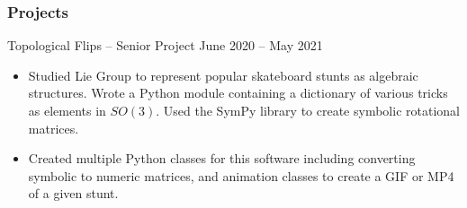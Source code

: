 \documentclass[letterpaper, 10 pt]{article}
\begin{document}
\subsubsection*{Projects}
\centerline{Topological Flips – Senior Project \hfill June 2020 – May 2021}
\begin{itemize}
\setlength\itemsep{0.10 em}
\item Studied Lie Group to represent popular skateboard stunts as algebraic structures. Wrote a Python module containing a dictionary of various tricks as elements in $SO(3)$. Used the SymPy library to create symbolic rotational matrices.
\item Created multiple Python classes for this software including converting symbolic to numeric matrices, and animation classes to create a GIF or MP4 of a given stunt.
\end{itemize}
\end{document}
